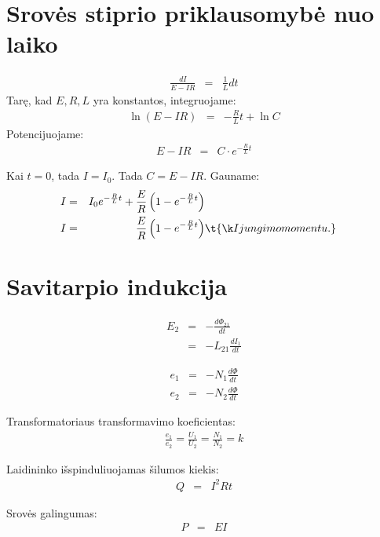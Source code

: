 \section{Srovės stiprio priklausomybė nuo laiko}

\begin{align*}
  \frac{d I}{E - I R} &=& \frac{1}{L} dt
\end{align*}
Tarę, kad $E, R, L$ yra konstantos, integruojame:
\begin{align*}
  \ln \left( E - IR \right) &=& - \frac{R}{L}t + \ln C
\end{align*}
Potencijuojame:
\begin{align*}
  E - IR &=& C \cdot e^{-\frac{R}{L}t}
\end{align*}

Kai $t = 0$, tada $I = I_{0}$. Tada $C = E - IR$. Gauname:
\begin{align*}
  I &=& I_{0}e^{-\frac{R}{L}t} + \frac{E}{R}
    \left( 1 - e^{-\frac{R}{L}t}\right) \\
  I &=& \frac{E}{R} \left( 1 - e^{-\frac{R}{L}t} \right)
    & \t{Įjungimo momentu.}
\end{align*}

\section{Savitarpio indukcija}

\begin{align*}
  E_{2} &=& -\frac{d\Phi_{21}}{dt} \\
  &=& - L_{21} \frac{dI_{1}}{dt}
\end{align*}


\begin{align*}
  e_{1} &=& - N_{1} \frac{d \Phi}{dt} \\
  e_{2} &=& - N_{2} \frac{d \Phi}{dt}
\end{align*}

Transformatoriaus transformavimo koeficientas:
\begin{align*}
  \frac{e_{1}}{e_{2}} = \frac{U_{1}}{U_{2}} = \frac{N_{1}}{N_{2}} = k
\end{align*}

Laidininko išspinduliuojamas šilumos kiekis:
\begin{align*}
  Q &=& I^{2} R t
\end{align*}

Srovės galingumas:
\begin{align*}
  P &=& E I
\end{align*}

